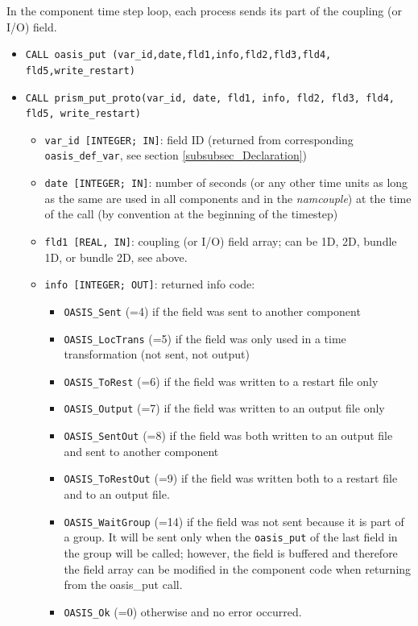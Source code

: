 In the component time step loop, each process sends its part of the
coupling (or I/O) field.

\begin{itemize}
\item {\tt CALL oasis\_put (var\_id,date,fld1,info,fld2,fld3,fld4, fld5,write\_restart)}
\item {\tt CALL prism\_put\_proto(var\_id, date, fld1, info, fld2,
    fld3, fld4, fld5, write\_restart)}
  \begin{itemize}
  \item {\tt var\_id [INTEGER; IN]}: field ID (returned from corresponding {\tt
      oasis\_def\_var}, see section \ref{subsubsec_Declaration})
  \item {\tt date [INTEGER; IN]}: number of seconds (or any other time
    units as long as the same are used in all components and in the {\it
      namcouple}) at the time of the call (by convention at the
    beginning of the timestep)
  \item {\tt fld1 [REAL, IN]}: coupling (or I/O) field array; can be
    1D, 2D, bundle 1D, or bundle 2D, see above. 
  \item {\tt info [INTEGER; OUT]}: returned info code:
    \begin{itemize}
    \item {\tt OASIS\_Sent} (=4) if the field was sent to another component
    \item {\tt OASIS\_LocTrans} (=5) if the field was only used in a time
      transformation (not sent, not output)
    \item {\tt OASIS\_ToRest} (=6) if the field was written to a restart
      file only
    \item {\tt OASIS\_Output} (=7) if the field was written to an output
      file only
    \item {\tt OASIS\_SentOut} (=8) if the field was both written to an
      output file and sent to another component 
    \item {\tt OASIS\_ToRestOut} (=9) if the field was written both to a
      restart file and to an output file.
    \item {\tt OASIS\_WaitGroup} (=14) if the field was not sent because it is part of a group.
    It will be sent only when the {\tt oasis\_put} of the last field in the group will be called; however, the field is buffered and therefore the field array can be modified in the component code when returning from the oasis\_put call.
    \item {\tt OASIS\_Ok} (=0) otherwise and no error occurred.

\end{itemize}
\end{itemize}
\end{itemize}
